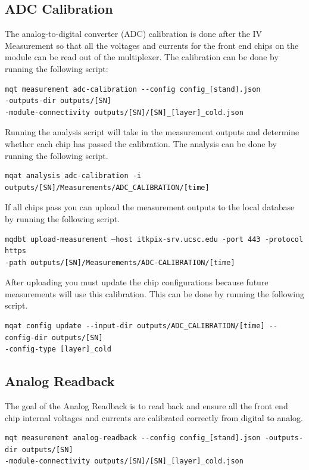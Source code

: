 \documentclass[12pt]{article}
\begin{document}
\subsection{ADC Calibration}

The analog-to-digital converter (ADC) calibration is done after the IV Measurement so that all the voltages and currents for the front end chips on the module can be read out of the multiplexer. The calibration can be done by running the following script:
\begin{verbatim}
mqt measurement adc-calibration --config config_[stand].json 
-outputs-dir outputs/[SN]
-module-connectivity outputs/[SN]/[SN]_[layer]_cold.json
\end{verbatim}


Running the analysis script will take in the measurement outputs and determine whether each chip has passed the calibration. The analysis can be done by running the following script. 

\begin{verbatim}
mqat analysis adc-calibration -i outputs/[SN]/Measurements/ADC_CALIBRATION/[time]
\end{verbatim}
If all chips pass you can upload the measurement outputs to the local database by running the following script. 
\begin{verbatim}
mqdbt upload-measurement –host itkpix-srv.ucsc.edu -port 443 -protocol https
-path outputs/[SN]/Measurements/ADC-CALIBRATION/[time]
\end{verbatim}
After uploading you must update the chip configurations because future measurements will use this calibration. This can be done by running the following script. 
\begin{verbatim}
mqat config update --input-dir outputs/ADC_CALIBRATION/[time] --config-dir outputs/[SN] 
-config-type [layer]_cold
\end{verbatim}

\subsection{Analog Readback}

The goal of the Analog Readback is to read back and ensure all the front end chip internal voltages and currents are calibrated correctly from digital to analog.  

\begin{verbatim}
mqt measurement analog-readback --config config_[stand].json -outputs-dir outputs/[SN]
-module-connectivity outputs/[SN]/[SN]_[layer]_cold.json
\end{verbatim}
\end{document}
